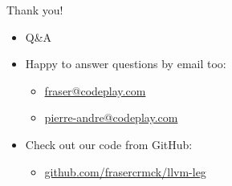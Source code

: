 \documentclass[t]{beamer}
\begin{document}
\begin{frame}{Thank you!}

\begin{itemize}
    \item Q\&A
    \item Happy to answer questions by email too:
    \begin{itemize}
        \item \url{fraser@codeplay.com}
        \item \url{pierre-andre@codeplay.com}
    \end{itemize}
    \item Check out our code from GitHub:
    \begin{itemize}
        \item \url{github.com/frasercrmck/llvm-leg}
    \end{itemize}
\end{itemize}

\end{frame}

\end{document}
